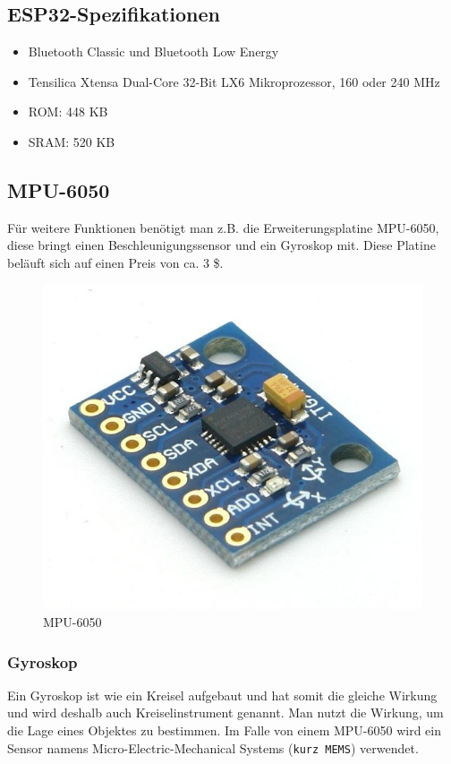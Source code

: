 \subsection{ESP32-Spezifikationen}

\begin{itemize}
	\item Bluetooth Classic und Bluetooth Low Energy
	\item Tensilica Xtensa Dual-Core 32-Bit LX6 Mikroprozessor, 160 oder 240 MHz
	\item ROM:  448 KB
	\item SRAM:  520 KB 
\end{itemize}

\subsection{MPU-6050}

Für weitere Funktionen benötigt man z.B. die Erweiterungsplatine MPU-6050, diese bringt einen Beschleunigungssensor und ein Gyroskop mit. Diese Platine beläuft sich auf einen Preis von ca. 3 \$.

\begin{figure}[H]
	\centering
	\includegraphics[width=0.7\linewidth]{images/MPU6050.jpg}
	\caption[MPU6050]{MPU-6050}
	\label{fig:MPU6050}
\end{figure}

\newpage
\subsubsection{Gyroskop}

Ein Gyroskop ist wie ein Kreisel aufgebaut und hat somit die gleiche Wirkung und wird deshalb auch Kreiselinstrument genannt. Man nutzt die Wirkung, um die Lage eines Objektes zu bestimmen. Im Falle von einem MPU-6050 wird ein Sensor namens Micro-Electric-Mechanical Systems (\texttt{kurz MEMS}) verwendet. 


